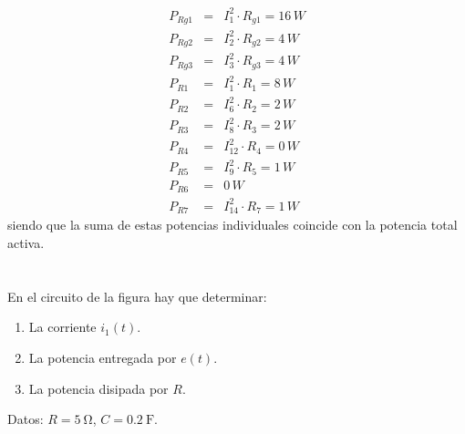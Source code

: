 \documentclass[10pt]{article}
\begin{document}
\begin{eqnarray*}
P_{Rg1} & = & I_{1}^{2}\cdot R_{g1}=16\, W\\
P_{Rg2} & = & I_{2}^{2}\cdot R_{g2}=4\, W\\
P_{Rg3} & = & I_{3}^{2}\cdot R_{g3}=4\, W\\
P_{R1} & = & I_{1}^{2}\cdot R_{1}=8\, W\\
P_{R2} & = & I_{6}^{2}\cdot R_{2}=2\, W\\
P_{R3} & = & I_{8}^{2}\cdot R_{3}=2\, W\\
P_{R4} & = & I_{12}^{2}\cdot R_{4}=0\, W\\
P_{R5} & = & I_{9}^{2}\cdot R_{5}=1\, W\\
P_{R6} & = & 0\, W\\
P_{R7} & = & I_{14}^{2}\cdot R_{7}=1\, W
\end{eqnarray*}
siendo que la suma de estas potencias individuales coincide con la
potencia total activa.

\clearpage

\section{}

En el circuito de la figura hay que determinar:

\begin{enumerate}
\item La corriente $i_1(t)$.
\item La potencia entregada por $e(t)$.
\item La potencia disipada por $R$.
\end{enumerate}

Datos: $R = \SI{5}{\ohm}$, $C = \SI{0.2}{\farad}$.
\end{document}
